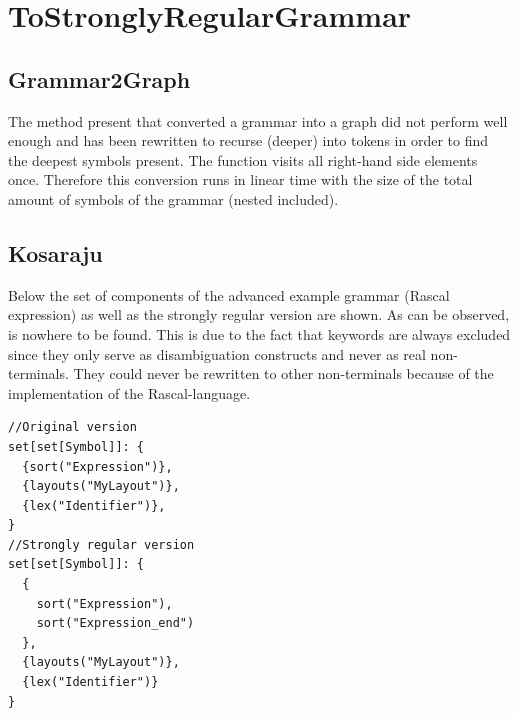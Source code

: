 \section{ToStronglyRegularGrammar}

\subsection{Grammar2Graph}
The method present that converted a grammar into a graph did not perform well enough and has been rewritten to recurse (deeper) into tokens in order to find the deepest symbols present. The function visits all right-hand side elements once. Therefore this conversion runs in linear time with the size of the total amount of symbols of the grammar (nested included).

\subsection{Kosaraju}
Below the set of components of the advanced example grammar (Rascal expression) as well as the strongly regular version are shown. As can be observed,  is nowhere to be found. This is due to the fact that keywords are always excluded since they only serve as disambiguation constructs and never as real non-terminals. They could never be rewritten to other non-terminals because of the implementation of the Rascal-language.
\begin{lstlisting}
//Original version
set[set[Symbol]]: {
  {sort("Expression")},
  {layouts("MyLayout")},
  {lex("Identifier")},
}
//Strongly regular version
set[set[Symbol]]: {
  {
    sort("Expression"),
    sort("Expression_end")
  },
  {layouts("MyLayout")},
  {lex("Identifier")}
}
\end{lstlisting}

\pagebreak
